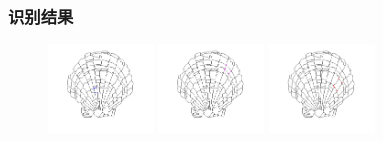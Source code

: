 \documentclass[notheorems,mathserif,table,compress]{beamer}  %
\begin{document}
\begin{frame}
\frametitle{识别结果}
\begin{figure}
\centering
  \begin{minipage}[b]{0.3\textwidth} 
      \centering 
      \includegraphics[width=2.8cm]{chap04/suoxiao-yuantu}
    \end{minipage}
  \begin{minipage}[b]{0.3\textwidth} 
      \centering 
      \includegraphics[width=2.8cm]{chap04/zhegai-yuantu}
    \end{minipage}
  \begin{minipage}[b]{0.3\textwidth} 
      \centering 
      \includegraphics[width=2.8cm]{chap04/xuanzhuan-yuantu}
    \end{minipage}


\end{figure}
\end{frame}
\end{document}
